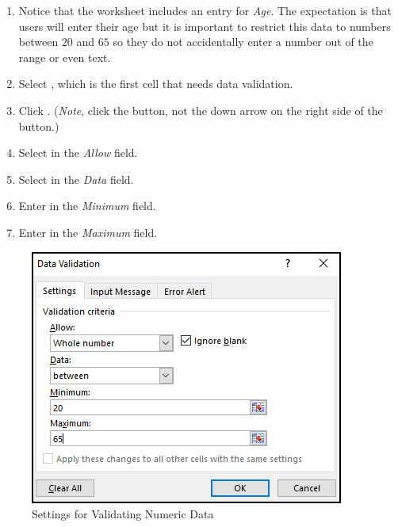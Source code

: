 \begin{enumerate}
	\item Notice that the  worksheet includes an entry for \textit{Age}. The expectation is that users will enter their age but it is important to restrict this data to numbers between $ 20 $ and $ 65 $ so they do not accidentally enter a number out of the range or even text.
	\item Select , which is the first cell that needs data validation. 
	\item Click . (\textit{Note}, click the button, not the down arrow on the right side of the button.)
	\item Select  in the \textit{Allow} field.
	\item Select  in the \textit{Data} field.
	\item Enter  in the \textit{Minimum} field.
	\item Enter  in the \textit{Maximum} field.
\end{enumerate}

\begin{figure}[H]
	\centering
	\includegraphics[width=\maxwidth{.75\linewidth}]{gfx/ch07_fig39}
	\caption{Settings for Validating Numeric Data}
	\label{07:fig39}
\end{figure}

